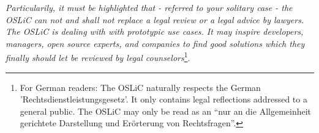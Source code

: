\textit{Particularily, it must be highlighted that - referred to your solitary
case - the OSLiC can not and shall not replace a legal review or a legal advice
by lawyers. The OSLiC is dealing with with prototypic use cases. It may inspire
developers, managers, open source experts, and companies to find good solutions
which they finally should let be reviewed by legal counselors}\footnote{For
German readers: The OSLiC naturally respects the German
'Rechtsdienstleistungsgesetz'. It only contains legal reflections addressed to a
general public. The OSLiC may only be read as an \enquote{nur an die
Allgemeinheit gerichtete Darstellung und Erörterung von Rechtsfragen}.}.



